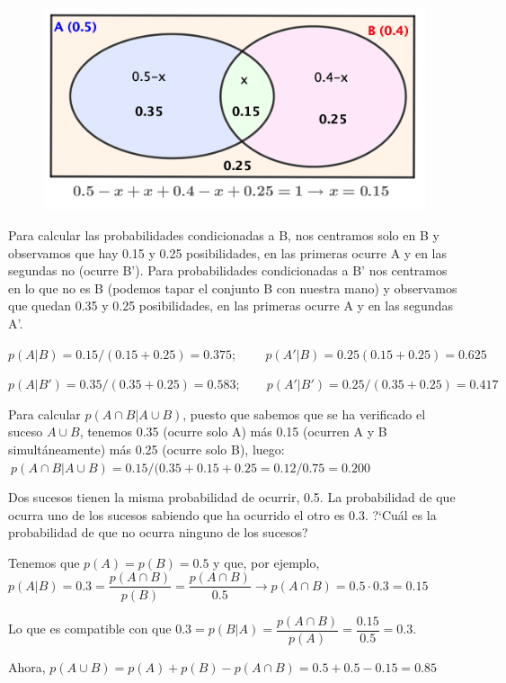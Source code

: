 	\begin{figure}[H]
		\centering
		\includegraphics[width=.6\textwidth]{imagenes/imagenes02/T02IM40.png}
	\end{figure}

Para calcular las probabilidades condicionadas a B, nos centramos solo en B y observamos que hay 0.15 y 0.25 posibilidades, en las primeras ocurre A y en las segundas no (ocurre B'). Para probabilidades condicionadas a B' nos centramos en lo que no es B (podemos tapar el conjunto B con nuestra mano) y observamos que quedan 0.35 y 0.25 posibilidades, en las primeras ocurre A y en las segundas A'.


$p(A|B)=0.15/(0.15+0.25)=0.375; \qquad \ p(A'|B)=0.25(0.15+0.25)=0.625$

$p(A|B')=0.35/(0.35+0.25)=0.583;\qquad p(A'|B')=0.25/(0.35+0.25)=0.417$


Para calcular $p(A\cap B|A\cup B)$, puesto que sabemos que se ha verificado el suceso $A\cup B$, tenemos 0.35 (ocurre solo A) más 0.15 (ocurren A y B simultáneamente) más 0.25 (ocurre solo B), luego:
$\ p(A\cap B|A\cup B)=0.15/(0.35+0.15+0.25=0.12/0.75=0.200$

\vspace{5mm}
\begin{ejemplo}
\begin{ejer}
Dos sucesos tienen la misma probabilidad de ocurrir, 0.5. La probabilidad de que ocurra uno de los sucesos sabiendo que ha ocurrido el otro es 0.3. ?`Cuál es la probabilidad de que no ocurra ninguno de los sucesos?
\end{ejer}
\end{ejemplo}

Tenemos que $p(A)=p(B)=0.5$ y que, por ejemplo, $p(A|B)=0.3=\dfrac{p(A\cap B)}{p(B)}= \dfrac {p(A\cap B)} {0.5}  \to p(A\cap B)=0.5\cdot 0.3=0.15$

 \textcolor{gris}{Lo que es compatible con que $0.3=p(B|A)=\dfrac{p(A\cap B)}{p(A)}=\dfrac{0.15}{0.5}=0.3$. }  

Ahora, $p(A\cup B)=p(A)+p(B)-p(A\cap B)=0.5+0.5-0.15=0.85$

